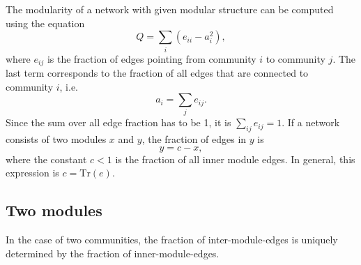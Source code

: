 The modularity of a network with given modular structure can be computed using the equation
\begin{equation}\label{eq:mod_undir}
Q=\sum _i \left( e_{ii}-a_i^2 \right),
\end{equation}
where $e_{ij}$ is the fraction of edges pointing from community $i$ to community $j$.
The last term corresponds to the fraction of all edges that are connected to community $i$, i.e.
\[
a_i = \sum _j e_{ij}.
\]
Since the sum over all edge fraction has to be 1, it is $\sum _{ij}e_{ij}=1$.
If a network consists of two modules $x$ and $y$, the fraction of edges in $y$ is
\begin{equation}\label{qmaxbedingung}
y=c-x,
\end{equation}
where the constant $c<1$ is the fraction of all inner module edges.
In general, this expression is $c=\mathrm{Tr} (e)$.

\subsection{Two modules}
In the case of two communities, the fraction of inter-module-edges is uniquely determined by the fraction of inner-module-edges.

